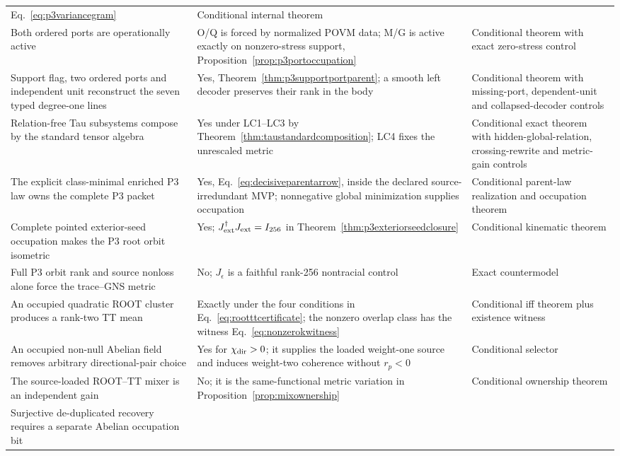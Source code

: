 \documentclass[11pt]{article}
\begin{document}
\begin{longtable}{@{}p{}p{}p{}@{}}
Eq.~\eqref{eq:p3variancegram} & Conditional internal theorem\\
Both ordered ports are operationally active & O/Q is forced by normalized
POVM data; M/G is active exactly on nonzero-stress support,
Proposition~\ref{prop:p3portoccupation} & Conditional theorem with exact
zero-stress control\\
Support flag, two ordered ports and independent unit reconstruct the seven
typed degree-one lines & Yes, Theorem~\ref{thm:p3supportportparent}; a smooth
left decoder preserves their rank in the body & Conditional theorem with
missing-port, dependent-unit and collapsed-decoder controls\\
Relation-free Tau subsystems compose by the standard tensor algebra &
Yes under LC1--LC3 by
Theorem~\ref{thm:taustandardcomposition}; LC4 fixes the unrescaled metric &
Conditional exact theorem with hidden-global-relation, crossing-rewrite and
metric-gain controls\\
The explicit class-minimal enriched P3 law owns the complete P3 packet & Yes,
Eq.~\eqref{eq:decisiveparentarrow}, inside the declared source-irredundant
MVP; nonnegative global minimization supplies occupation & Conditional
parent-law realization and occupation theorem\\
Complete pointed exterior-seed occupation makes the P3 root orbit isometric &
Yes; $J_{\rm ext}^\dagger J_{\rm ext}=I_{256}$ in
Theorem~\ref{thm:p3exteriorseedclosure} & Conditional kinematic theorem\\
Full P3 orbit rank and source nonloss alone force the trace--GNS metric & No;
$J_\epsilon$ is a faithful rank-256 nontracial control & Exact countermodel\\
An occupied quadratic ROOT cluster produces a rank-two TT mean & Exactly
under the four conditions in Eq.~\eqref{eq:rootttcertificate}; the nonzero
overlap class has the witness Eq.~\eqref{eq:nonzerokwitness} & Conditional
iff theorem plus existence witness\\
An occupied non-null Abelian field removes arbitrary directional-pair choice
& Yes for $\chi_{\rm dir}>0$; it supplies the loaded weight-one source and
induces weight-two coherence without $r_p<0$ & Conditional selector\\
The source-loaded ROOT--TT mixer is an independent gain & No; it is the
same-functional metric variation in Proposition~\ref{prop:mixownership} &
Conditional ownership theorem\\
Surjective de-duplicated recovery requires a separate Abelian occupation bit

\end{longtable}
\end{document}
